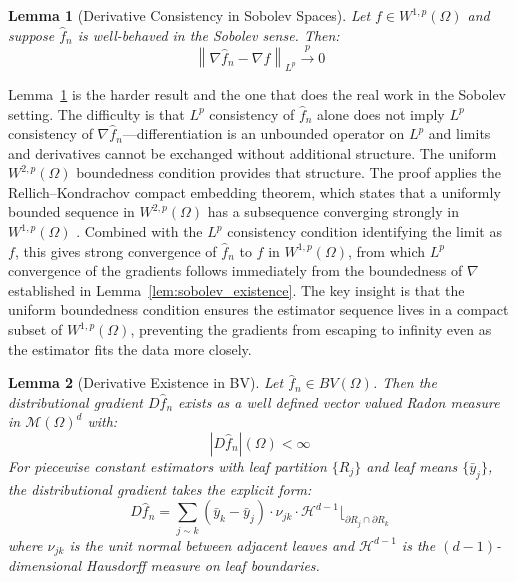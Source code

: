 \documentclass[12pt]{article}
\newtheorem{lemma}{Lemma}
\newcommand{\norm}[1]{\left\| #1 \right\|}
\newcommand{\Wonep}{W^{1,p}(\Omega)}
\newcommand{\Wtwop}{W^{2,p}(\Omega)}
\newcommand{\BV}{BV(\Omega)}
\newcommand{\cM}{\mathcal{M}(\Omega)^d}
\newcommand{\fn}{\hat{f}_n}
\newcommand{\xrightarrowp}{\xrightarrow{p}}
\begin{document}
	\begin{lemma}[Derivative Consistency in Sobolev Spaces]
		\label{lem:sobolev_consistency}
		Let $f \in \Wonep$ and suppose $\fn$ is well-behaved in the Sobolev sense. Then:
		\begin{equation}
			\norm{\nabla \fn - \nabla f}_{L^p} \xrightarrowp 0
		\end{equation}
	\end{lemma}
	
	Lemma~\ref{lem:sobolev_consistency} is the harder result and the one that does the
	real work in the Sobolev setting. The difficulty is that $L^p$ consistency of $\fn$
	alone does not imply $L^p$ consistency of $\nabla \fn$---differentiation is an
	unbounded operator on $L^p$ and limits and derivatives cannot be exchanged without
	additional structure. The uniform $\Wtwop$ boundedness condition provides that
	structure. The proof applies the Rellich--Kondrachov compact embedding theorem, which
	states that a uniformly bounded sequence in $\Wtwop$ has a subsequence converging
	strongly in $\Wonep$ \citep[Theorem~5,~Section~5.7]{evans2010pde}. Combined with
	the $L^p$ consistency condition identifying the limit as $f$, this gives strong
	convergence of $\fn$ to $f$ in $\Wonep$, from which $L^p$ convergence of the
	gradients follows immediately from the boundedness of $\nabla$ established in
	Lemma~\ref{lem:sobolev_existence}. The key insight is that the uniform boundedness
	condition ensures the estimator sequence lives in a compact subset of $\Wonep$,
	preventing the gradients from escaping to infinity even as the estimator fits the
	data more closely.
	
	\begin{lemma}[Derivative Existence in BV]
		\label{lem:bv_existence}
		Let $\fn \in \BV$. Then the distributional gradient $D\fn$ exists as a well defined
		vector valued Radon measure in $\cM$ with:
		\begin{equation}
			|D\fn|(\Omega) < \infty
		\end{equation}
		For piecewise constant estimators with leaf partition $\{R_j\}$ and leaf means
		$\{\bar{y}_j\}$, the distributional gradient takes the explicit form:
		\begin{equation}
			D\fn = \sum_{j \sim k} (\bar{y}_k - \bar{y}_j) \cdot \nu_{jk} \cdot
			\mathcal{H}^{d-1}\lfloor_{\partial R_j \cap \partial R_k}
		\end{equation}
		where $\nu_{jk}$ is the unit normal between adjacent leaves and $\mathcal{H}^{d-1}$
		is the $(d-1)$-dimensional Hausdorff measure on leaf boundaries.
	\end{lemma}
	
\end{document}
